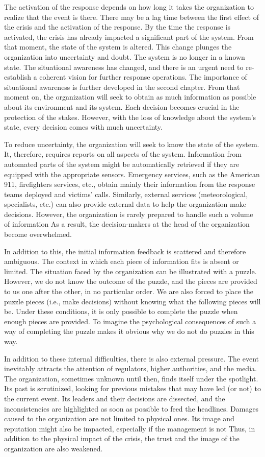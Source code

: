 The activation of the response depends on how long it takes the organization to realize that the event is there.
There may be a lag time between the first effect of the crisis and the activation of the response.
By the time the response is activated, the crisis has already impacted a significant part of the system.
From that moment, the state of the system is altered.
This change plunges the organization into uncertainty and doubt.
The system is no longer in a known state.
The situational awareness has changed, and there is an urgent need to re-establish a coherent vision for further response operations.
The importance of situational awareness is further developed in the second chapter.
From that moment on, the organization will seek to obtain as much information as possible about its environment and its system.
Each decision becomes crucial in the protection of the stakes.
However, with the loss of knowledge about the system's state, every decision comes with much uncertainty.

To reduce uncertainty, the organization will seek to know the state of the system.
It, therefore, requires reports on all aspects of the system.
Information from automated parts of the system might be automatically retrieved if they are equipped with the appropriate sensors.
Emergency services, such as the American 911, firefighters services, etc., obtain mainly their information from the response teams deployed and victims' calls.
Similarly, external services (meteorological, specialists, etc.) can also provide external data to help the organization make decisions.
However, the organization is rarely prepared to handle such a volume of information
As a result, the decision-makers at the head of the organization become overwhelmed.

In addition to this, the initial information feedback is scattered and therefore ambiguous.
The context in which each piece of information fits is absent or limited.
The situation faced by the organization can be illustrated with a puzzle.
However, we do not know the outcome of the puzzle, and the pieces are provided to us one after the other, in no particular order.
We are also forced to place the puzzle pieces (i.e., make decisions) without knowing what the following pieces will be.
Under these conditions, it is only possible to complete the puzzle when enough pieces are provided.
To imagine the psychological consequences of such a way of completing the puzzle makes it obvious why we do not do puzzles in this way.

In addition to these internal difficulties, there is also external pressure.
The event inevitably attracts the attention of regulators, higher authorities, and the media.
The organization, sometimes unknown until then, finds itself under the spotlight.
Its past is scrutinized, looking for previous mistakes that may have led (or not) to the current event.
Its leaders and their decisions are dissected, and the inconsistencies are highlighted as soon as possible to feed the headlines.
Damages caused to the organization are not limited to physical ones.
Its image and reputation might also be impacted, especially if the management is not
Thus, in addition to the physical impact of the crisis, the trust and the image of the organization are also weakened.

